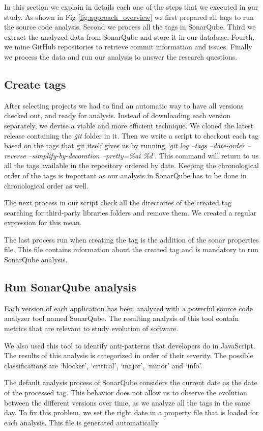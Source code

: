 In this section we explain in details each one of the steps that we executed in our study. As shown in Fig \ref{fig:approach_overview} we first prepared all tags to run the source code analysis. Second we process all the tags in SonarQube. Third we extract the analyzed data from SonarQube and store it in our database. Fourth, we mine GitHub repositories to retrieve commit information and issues. Finally we process the data and run our analysis to answer the research questions.  
 
\subsection{Create tags}

After selecting projects we had to find an automatic way to have all versions checked out, and ready for analysis. Instead of downloading each version separately, we devise a viable and more efficient technique. We cloned the latest release containing the \textit{\.git} folder in it. Then we write a script to checkout each tag based on the tags that git itself gives us by running \textit{`git log --tags --date-order --reverse --simplify-by-decoration --pretty=\%ai \%d'}. This command will return to us all the tags available in the repository ordered by date. Keeping the chronological order of the tags is important as our analysis in SonarQube has to be done in chronological order as well. 

The next process in our script check all the directories of the created tag searching for third-party libraries folders and remove them. We created a regular expression for this mean. 

The last process run when creating the tag is the addition of the sonar properties file. This file contains information about the created tag and is mandatory to run SonarQube analysis.


\subsection{Run SonarQube analysis}

\par
Each version of each application has been analyzed with a powerful source code analyzer tool named SonarQube. The resulting analysis of this tool contain metrics that are relevant to study evolution of software. 
\par
We also used this tool to identify anti-patterns that developers do in JavaScript. The results of this analysis is categorized in order of their severity. The possible classifications are `blocker', `critical', `major', `minor' and `info'.
\par
The default analysis process of SonarQube considers the current date as the date of the processed tag. This behavior does not allow us to observe the evolution between the different versions over time, as we analyze all the tags in the same day. To fix this problem, we set the right date in a property file that is loaded for each analysis. This file is generated automatically  


